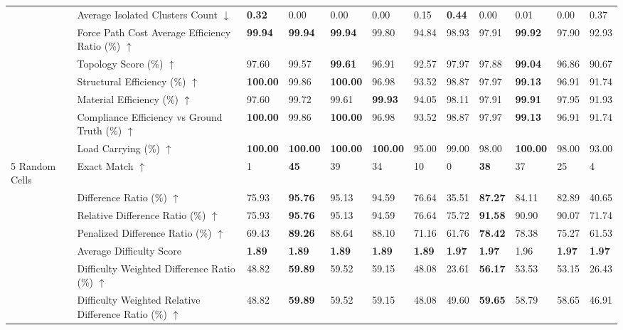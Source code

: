 \begin{table}[!h]
{\begin{tabular}{lllllll|lllll}
 & Average Isolated Clusters Count $\downarrow$ & \textbf{0.32} & 0.00 & 0.00 & 0.00 & 0.15 & \textbf{0.44} & 0.00 & 0.01 & 0.00 & 0.37 \\
 & Force Path Cost Average Efficiency Ratio (\%) $\uparrow$ & \textbf{99.94} & \textbf{99.94} & \textbf{99.94} & 99.80 & 94.84 & 98.93 & 97.91 & \textbf{99.92} & 97.90 & 92.93 \\
 & Topology Score (\%) $\uparrow$ & 97.60 & 99.57 & \textbf{99.61} & 96.91 & 92.57 & 97.97 & 97.88 & \textbf{99.04} & 96.86 & 90.67 \\
 & Structural Efficiency (\%) $\uparrow$ & \textbf{100.00} & 99.86 & \textbf{100.00} & 96.98 & 93.52 & 98.87 & 97.97 & \textbf{99.13} & 96.91 & 91.74 \\
 & Material Efficiency (\%) $\uparrow$ & 97.60 & 99.72 & 99.61 & \textbf{99.93} & 94.05 & 98.11 & 97.91 & \textbf{99.91} & 97.95 & 91.93 \\
 & Compliance Efficiency vs Ground Truth (\%) $\uparrow$ & \textbf{100.00} & 99.86 & \textbf{100.00} & 96.98 & 93.52 & 98.87 & 97.97 & \textbf{99.13} & 96.91 & 91.74 \\
 & Load Carrying (\%) $\uparrow$ & \textbf{100.00} & \textbf{100.00} & \textbf{100.00} & \textbf{100.00} & 95.00 & 99.00 & 98.00 & \textbf{100.00} & 98.00 & 93.00 \\
\midrule
5 Random Cells & Exact Match $\uparrow$ & 1 & \textbf{45} & 39 & 34 & 10 & 0 & \textbf{38} & 37 & 25 & 4 \\
 & Difference Ratio (\%) $\uparrow$ & 75.93 & \textbf{95.76} & 95.13 & 94.59 & 76.64 & 35.51 & \textbf{87.27} & 84.11 & 82.89 & 40.65 \\
 & Relative Difference Ratio (\%) $\uparrow$ & 75.93 & \textbf{95.76} & 95.13 & 94.59 & 76.64 & 75.72 & \textbf{91.58} & 90.90 & 90.07 & 71.74 \\
 & Penalized Difference Ratio (\%) $\uparrow$ & 69.43 & \textbf{89.26} & 88.64 & 88.10 & 71.16 & 61.76 & \textbf{78.42} & 78.38 & 75.27 & 61.53 \\
 & Average Difficulty Score & \textbf{1.89} & \textbf{1.89} & \textbf{1.89} & \textbf{1.89} & \textbf{1.89} & \textbf{1.97} & \textbf{1.97} & 1.96 & \textbf{1.97} & \textbf{1.97} \\
 & Difficulty Weighted Difference Ratio (\%) $\uparrow$ & 48.82 & \textbf{59.89} & 59.52 & 59.15 & 48.08 & 23.61 & \textbf{56.17} & 53.53 & 53.15 & 26.43 \\
 & Difficulty Weighted Relative Difference Ratio (\%) $\uparrow$ & 48.82 & \textbf{59.89} & 59.52 & 59.15 & 48.08 & 49.60 & \textbf{59.65} & 58.79 & 58.65 & 46.91 \\

\end{tabular}}
\end{table}
